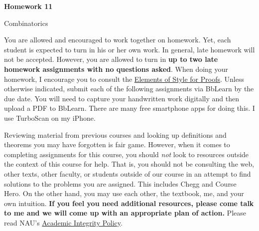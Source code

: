 \documentclass[11pt]{article}%
\theoremstyle{definition}
\newcommand{\blankline}{\pagebreak[2]\vspace{.5\baselineskip}}
\begin{document}
\begin{center}
{\Large\bf Homework 11}

\smallskip

Combinatorics
\end{center}

\thispagestyle{fancy}

You are allowed and encouraged to work together on homework. Yet, each student is expected to turn in his or her own work. In general, late homework will not be accepted. However, you are allowed to turn in \textbf{up to two late homework assignments with no questions asked}. When doing your homework, I encourage you to consult the \href{http://danaernst.com/teaching/ElementsOfStyle.pdf}{Elements of Style for Proofs}. Unless otherwise indicated, submit each of the following assignments via BbLearn by the due date. You will need to capture your handwritten work digitally and then upload a PDF to BbLearn. There are many free smartphone apps for doing this. I use TurboScan on my iPhone.

\blankline

Reviewing material from previous courses and looking up definitions and theorems you may have forgotten is fair game. However, when it comes to completing assignments for this course, you should \emph{not} look to resources outside the context of this course for help.  That is, you should not be consulting the web, other texts, other faculty, or students outside of our course in an attempt to find solutions to the problems you are assigned.  This includes Chegg and Course Hero. On the other hand, you may use each other, the textbook, me, and your own intuition. \textbf{If you feel you need additional resources, please come talk to me and we will come up with an appropriate plan of action.} Please read NAU's \href{https://www5.nau.edu/policies/Client/Details/828?whoIsLooking=Students&pertainsTo=All&sortDirection=Ascending&page=1}{Academic Integrity Policy}.

\blankline
\end{document}
